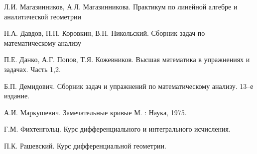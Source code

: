 %
%
%
%
%

\begin{thebibliography}{99}
	
	 Л.И. Магазинников, А.Л. Магазинникова. Практикум по линейной алгебре и аналитической геометрии
	
	 Н.А. Давдов, П.П. Коровкин, В.Н. Никольский. Сборник задач по математическому анализу
	
	 П.Е. Данко, А.Г. Попов, Т.Я. Кожевников. Высшая математика в упражнениях и задачах. Часть 1,2.
	
	 Б.П. Демидович. Сборник задач и упражнений по математическому анализу. 13--е издание.
	
	 А.И. Маркушевич. Замечательные кривые М. : Наука, 1975.
	
	 Г.М. Фихтенгольц. Курс дифференциального и интегрального исчисления.
	
	 П.К. Рашевский. Курс дифференциальной геометрии.
	
\end{thebibliography}